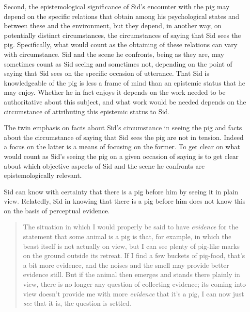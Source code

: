 \documentclass[11pt]{article}
\begin{document}
Second, the epistemological significance of Sid's encounter with the pig may depend on the specific relations that obtain among his psychological states and between these and the environment, but they depend, in another way, on potentially distinct circumstances, the circumstances of saying that Sid sees the pig. Specifically, what would count as the obtaining of these relations can vary with circumstance. Sid and the scene he confronts, being as they are, may sometimes count as Sid seeing and sometimes not, depending on the point of saying that Sid sees on the specific occasion of utterance. That Sid is knowledgeable of the pig is less a frame of mind than an epistemic status that he may enjoy. Whether he in fact enjoys it depends on the work needed to be authoritative about this subject, and what work would be needed depends on the circumstance of attributing this epistemic status to Sid.

The twin emphasis on facts about Sid's circumstance in seeing the pig and facts about the circumstance of saying that Sid sees the pig are not in tension. Indeed a focus on the latter is a means of focusing on the former. To get clear on what would count as Sid's seeing the pig on a given occasion of saying is to get clear about which objective aspects of Sid and the scene he confronts are epistemologically relevant.


Sid can know with certainty that there is a pig before him by seeing it in plain view. Relatedly, Sid in knowing that there is a pig before him does not know this on the basis of perceptual evidence.
\begin{quote}
    The situation in which I would properly be said to have \emph{evidence} for the statement that some animal is a pig is that, for example, in which the beast itself is not actually on view, but I can see plenty of pig-like marks on the ground outside its retreat. If I find a few buckets of pig-food, that’s a bit more evidence, and the noises and the smell may provide better evidence still. But if the animal then emerges and stands there plainly in view, there is no longer any question of collecting evidence; its coming into view doesn’t provide me with more \emph{evidence} that it’s a pig, I can now just \emph{see} that it is, the question is settled. \citep[115]{Austin:1962lr}
\end{quote}
\end{document}
